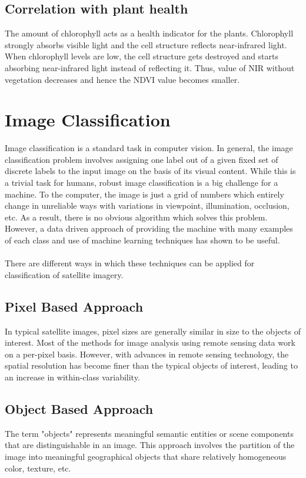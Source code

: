 \documentclass[12pt, a4paper]{report}
\begin{document}
\subsection{Correlation with plant health}
The amount of chlorophyll acts as a health indicator for the plants. Chlorophyll strongly absorbs visible light and the cell structure reflects near-infrared light. When chlorophyll levels are low, the cell structure gets destroyed and starts absorbing near-infrared light instead of reflecting it. Thus, value of NIR without vegetation decreases and hence the NDVI value becomes smaller.

\section{Image Classification}
Image classification is a standard task in computer vision. In general, the image classification problem involves assigning one  label out of a given fixed set of discrete labels to the input image on the basis of its visual content. While this is a trivial task for humans, robust image classification is a big challenge for a machine. To the computer, the image is just a grid of numbers which entirely change in unreliable ways with variations in viewpoint, illumination, occlusion, etc. As a result, there is no obvious algorithm which solves this problem. However, a data driven approach of providing the machine with many examples of each class and use of machine learning techniques has shown to be useful.\cite{cs231n}
\paragraph{}
There are different ways in which these techniques can be applied for classification of satellite imagery.
\subsection{Pixel Based Approach}
In typical satellite images, pixel sizes are generally similar in size to the objects of interest. Most of the methods for image analysis using remote sensing data work on a per-pixel basis. However, with advances in remote sensing technology, the spatial resolution has become finer than the typical objects of interest, leading to an increase in within-class variability.\cite{eyesky}
\subsection{Object Based Approach}
The term "objects" represents meaningful semantic entities or scene components that are distinguishable in an image.\cite{eyesky} This approach involves the partition of the image into meaningful geographical objects that share relatively homogeneous color, texture, etc.
\end{document}
